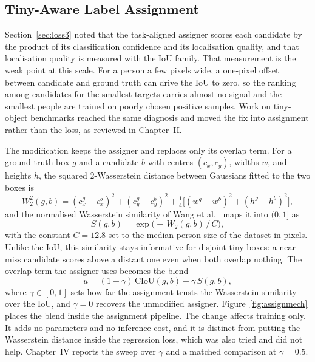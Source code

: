 \subsection{Tiny-Aware Label Assignment}
\label{sec:assignmethod}
Section~\ref{sec:loss3} noted that the task-aligned assigner scores each
candidate by the product of its classification confidence and its localisation
quality, and that localisation quality is measured with the IoU family. That
measurement is the weak point at this scale. For a person a few pixels wide, a
one-pixel offset between candidate and ground truth can drive the IoU to zero,
so the ranking among candidates for the smallest targets carries almost no
signal and the smallest people are trained on poorly chosen positive samples.
Work on tiny-object benchmarks reached the same diagnosis and moved the fix
into assignment rather than the loss, as reviewed in Chapter~II.

The modification keeps the assigner and replaces only its overlap term. For a
ground-truth box $g$ and a candidate $b$ with centres $(c_x, c_y)$, widths $w$,
and heights $h$, the squared 2-Wasserstein distance between Gaussians fitted to
the two boxes is
\begin{equation}
  W_2^2(g,b) = (c_{x}^{g}-c_{x}^{b})^2 + (c_{y}^{g}-c_{y}^{b})^2
             + \tfrac{1}{4}\big[(w^{g}-w^{b})^2 + (h^{g}-h^{b})^2\big],
\end{equation}
and the normalised Wasserstein similarity of Wang et al.~\cite{wang2021nwd}
maps it into $(0,1]$ as
\begin{equation}
  S(g,b) = \exp\!\big(-\,W_2(g,b)\,/\,C\big),
\end{equation}
with the constant $C=12.8$ set to the median person size of the dataset in
pixels. Unlike the IoU, this similarity stays informative for disjoint tiny
boxes: a near-miss candidate scores above a distant one even when both overlap
nothing. The overlap term the assigner uses becomes the blend
\begin{equation}
  u = (1-\gamma)\,\mathrm{CIoU}(g,b) + \gamma\, S(g,b),
  \label{eq:blend}
\end{equation}
where $\gamma \in [0,1]$ sets how far the assignment trusts the Wasserstein
similarity over the IoU, and $\gamma=0$ recovers the unmodified assigner.
Figure~\ref{fig:assignmech} places the blend inside the assignment pipeline.
The change affects training only. It adds no parameters and no inference cost,
and it is distinct from putting the Wasserstein distance inside the regression
loss, which was also tried and did not help. Chapter~IV reports the sweep over
$\gamma$ and a matched comparison at $\gamma=0.5$.

